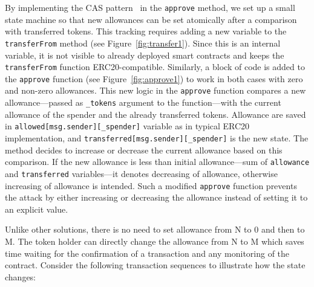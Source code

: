 
By implementing the CAS pattern~\cite{Ref06} in the \texttt{approve} method, we set up a small state machine so that new allowances can be set atomically after a comparison with transferred tokens. This tracking requires adding a new variable to the \texttt{transferFrom} method (see Figure~\ref{fig:transfer1}). Since this is an internal variable, it is not visible to already deployed smart contracts and keeps the \texttt{transferFrom} function ERC20-compatible. Similarly, a block of code is added to the \texttt{approve} function (see Figure~\ref{fig:approve1}) to work in both cases with zero and non-zero allowances. This new logic in the \texttt{approve} function compares a new allowance---passed as \texttt{\_tokens} argument to the function---with the current allowance of the spender and the already transferred tokens. Allowance are saved in \texttt{allowed[msg.sender][\_spender]} variable as in typical ERC20 implementation, and \texttt{transferred[msg.sender][\_spender]} is the new state. The method decides to increase or decrease the current allowance based on this comparison. If the new allowance is less than initial allowance---sum of \texttt{allowance} and \texttt{transferred} variables---it denotes decreasing of allowance, otherwise increasing of allowance is intended. Such a modified \texttt{approve} function prevents the attack by either increasing or decreasing the allowance instead of setting it to an explicit value.

Unlike other solutions, there is no need to set allowance from N to 0 and then to M. The token holder can directly change the allowance from N to M which saves time waiting for the confirmation of a transaction and any monitoring of the contract. Consider the following transaction sequences to illustrate how the state changes:

